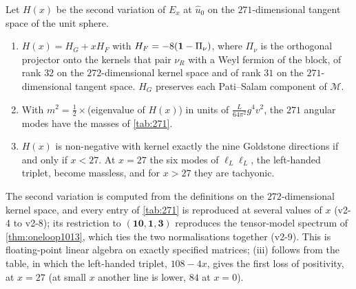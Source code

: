 \begin{theorem}
\label{thm:fullsecond}
Let $H(x)$ be the second variation of $E_x$ at $\hat u_0$ on the $271$-dimensional tangent space of the unit sphere.
\begin{enumerate}[label=(\roman*),leftmargin=2.2em]
\item $H(x)=H_G+xH_F$ with $H_F=-8(\mathbf 1-\Pi_\nu)$, where $\Pi_\nu$ is the orthogonal projector onto the kernels that pair $\nu_R$ with a Weyl fermion of the
block, of rank $32$ on the $272$-dimensional kernel space and of rank $31$ on the $271$-dimensional tangent space. $H_G$ preserves each Pati--Salam component of $\mathcal M$.
\item With $m^2=\tfrac12\times$(eigenvalue of $H(x)$) in units of $\tfrac L{64\pi^2}g^4v^2$, the $271$ angular modes have the masses of \cref{tab:271}.
\item $H(x)$ is non-negative with kernel exactly the nine Goldstone directions if and only if $x<27$. At $x=27$ the six modes of $\ell_L\ell_L$, the left-handed triplet,
become massless, and for $x>27$ they are tachyonic.
\end{enumerate}
\end{theorem}

The second variation is computed from the definitions on the $272$-dimensional kernel space, and every entry of \cref{tab:271} is reproduced at
several values of $x$ (v2-4 to v2-8); its restriction to $(\mathbf{10},\mathbf1,\mathbf3)$ reproduces the tensor-model spectrum of \cref{thm:oneloop1013}, which ties
the two normalisations together (v2-9). This is floating-point linear algebra on exactly specified matrices; (iii) follows from the table, in which the
left-handed triplet, $108-4x$, gives the first loss of positivity, at $x=27$ (at small $x$ another line is lower, $84$ at $x=0$).

